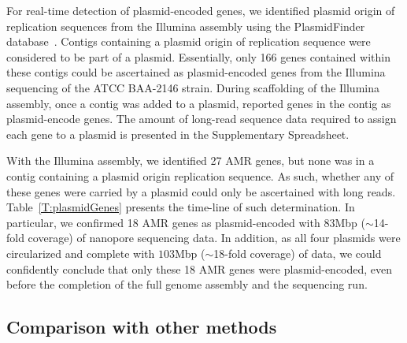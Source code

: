 For real-time detection of plasmid-encoded genes, we identified plasmid origin
of replication sequences from the Illumina assembly using the PlasmidFinder
database~\cite{CarattoliZG2014}. Contigs containing a plasmid origin of
replication sequence were considered to be part of a plasmid. Essentially, only 166
genes contained within these contigs could be ascertained as plasmid-encoded 
genes from the Illumina sequencing of the \kp{} ATCC BAA-2146 strain. During 
scaffolding of the Illumina assembly, once a contig was added to a plasmid,
\npscarf{} reported genes in the contig as plasmid-encode genes. The amount of 
long-read sequence data required to assign each gene to a plasmid is presented in 
the Supplementary Spreadsheet.  

With the Illumina assembly, we identified 27 AMR genes,  but none was in a
contig containing a plasmid origin replication sequence. As such, whether any 
of these genes were carried by a plasmid could only be ascertained with long
reads. Table~\ref{T:plasmidGenes} presents the time-line of such determination.
In particular, we confirmed 18 AMR genes as plasmid-encoded with $83$Mbp
($\sim$14-fold coverage) of nanopore sequencing data. In addition, as all four
plasmids were circularized and complete with $103$Mbp ($\sim$18-fold coverage) of
data, we could confidently conclude that only these 18 AMR genes were
plasmid-encoded, even before the completion of the full genome assembly and the
sequencing run.

\subsection{Comparison with other methods}

